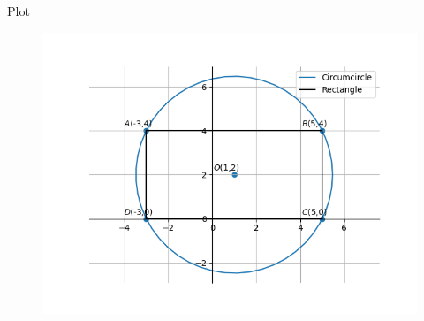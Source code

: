 \documentclass{beamer}
\begin{document}
\begin{frame}{Plot}
\begin{figure}
    \centering
    \includegraphics[width=0.75\linewidth]{figs/fig1.png}
    \caption{}
    \label{fig:placeholder}
\end{figure}
    
\end{frame}
\end{document}
